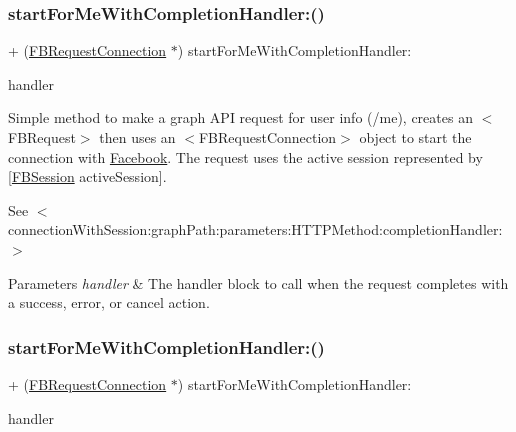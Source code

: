 \subsubsection{\texorpdfstring{start\+For\+Me\+With\+Completion\+Handler\+:()}{startForMeWithCompletionHandler:()}\hspace{0.1cm}{\footnotesize\ttfamily [3/5]}}
{\footnotesize\ttfamily + (\hyperlink{interfaceFBRequestConnection}{F\+B\+Request\+Connection} $\ast$) start\+For\+Me\+With\+Completion\+Handler\+: \begin{DoxyParamCaption}\item[{(F\+B\+Request\+Handler)}]{handler }\end{DoxyParamCaption}}

Simple method to make a graph A\+PI request for user info (/me), creates an $<$\+F\+B\+Request$>$ then uses an $<$\+F\+B\+Request\+Connection$>$ object to start the connection with \hyperlink{interfaceFacebook}{Facebook}. The request uses the active session represented by {\ttfamily \mbox{[}\hyperlink{interfaceFBSession}{F\+B\+Session} active\+Session\mbox{]}}.

See $<$connection\+With\+Session\+:graph\+Path\+:parameters\+:\+H\+T\+T\+P\+Method\+:completion\+Handler\+:$>$


\begin{DoxyParams}{Parameters}
{\em handler} & The handler block to call when the request completes with a success, error, or cancel action. \\
\hline
\end{DoxyParams}
\mbox{\label{interfaceFBRequestConnection_a9d89090f947eacfdf441172f842f5bc8}} 
\subsubsection{\texorpdfstring{start\+For\+Me\+With\+Completion\+Handler\+:()}{startForMeWithCompletionHandler:()}\hspace{0.1cm}{\footnotesize\ttfamily [4/5]}}
{\footnotesize\ttfamily + (\hyperlink{interfaceFBRequestConnection}{F\+B\+Request\+Connection} $\ast$) start\+For\+Me\+With\+Completion\+Handler\+: \begin{DoxyParamCaption}\item[{(F\+B\+Request\+Handler)}]{handler }\end{DoxyParamCaption}}

